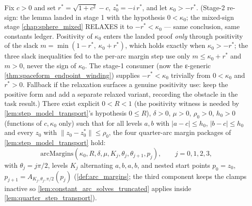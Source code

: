 \begin{lemma}
  \label{lem:step_model_margins}
  Fix $c>0$ and set $r^\ast=\sqrt{1+c^2}-c$, $z_0^\ast=-i\,r^\ast$, and let
  $\kappa_0>-r^\ast$. (Stage-2 re-sign: the lemma landed in stage 1 with the
  hypothesis $0<\kappa_0$; the mixed-sign stage \cref{chap:sphere_mixed} RELAXES it
  to $-r^\ast<\kappa_0$ — same conclusion, same constants ledger. Positivity of
  $\kappa_0$ enters the landed proof \emph{only} through positivity of the slack
  $m=\min(1-r^\ast,\ \kappa_0+r^\ast)$, which holds exactly when
  $\kappa_0>-r^\ast$; the three slack inequalities fed to the per-arc margin
  step use only $m\le\kappa_0+r^\ast$ and $m>0$, never the sign of $\kappa_0$.
  The stage-1 consumer (now the ε-generic \cref{thm:spaceform_endpoint_winding}) supplies
  $-r^\ast<\kappa_0$ trivially from $0<\kappa_0$ and $r^\ast>0$. Fallback if the
  relaxation surfaces a genuine positivity use: keep the positive form and add a
  separate relaxed variant, recording the obstacle in the task result.)
  There exist explicit $0<R<1$ (the positivity witness is needed
  by \cref{lem:step_model_transport}'s hypothesis $0\le R$), $\delta>0$, $\mu>0$,
  $\rho_0>0$, $h_0>0$ (functions of $c,\kappa_0$ only) such that for all levels $a,b$
  with $|a-c|\le h_0$, $|b-c|\le h_0$ and every $z_0$ with $\|z_0-z_0^\ast\|\le\rho_0$,
  the four quarter-arc margin packages of \cref{lem:step_model_transport} hold:
  \[
    \mathrm{arcMargins}(\kappa_0,R,\delta,\mu,K_j,\theta_j,\theta_{j+1},p_j),
    \qquad j=0,1,2,3,
  \]
  with $\theta_j=j\pi/2$, levels $K_j$ alternating $a,b,a,b$, and nested start points
  $p_0=z_0$, $p_{j+1}=A_{K_j,\theta_j,\pi/2}(p_j)$ (\cref{def:arc_margins}; the third
  component keeps the clamps inactive so \cref{lem:constant_arc_solves_truncated}
  applies inside \cref{lem:quarter_step_transport}).
\end{lemma}

